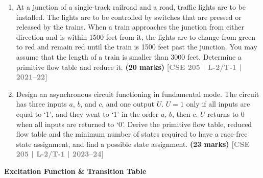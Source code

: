 \documentclass[12pt,a4paper]{article}
\newcommand{\yr}[1]{\hfill\textcolor{gray}{\small\textbf{[#1]}}}
\newcommand{\mk}[1]{\textcolor{orange!70!black}{\small\textbf{(#1 marks)}}}
\newcommand{\subtopic}[2]{%
  \vspace{10pt}
  \noindent\begin{tcolorbox}[colback=#1!8,colframe=#1,boxrule=0.6pt,arc=4pt,
    left=6pt,right=6pt,top=4pt,bottom=4pt]
    \small\bfseries\textcolor{#1}{#2}
  \end{tcolorbox}
  \vspace{2pt}
}
\begin{document}
\begin{enumerate}
\item At a junction of a single-track railroad and a road, traffic lights are to be installed. The lights are to be controlled by switches that are pressed or released by the trains. When a train approaches the junction from either direction and is within 1500 feet from it, the lights are to change from green to red and remain red until the train is 1500 feet past the junction. You may assume that the length of a train is smaller than 3000 feet. Determine a primitive flow table and reduce it.
\mk{20} \yr{CSE 205 | L-2/T-1 | 2021--22}

\item Design an asynchronous circuit functioning in fundamental mode. The circuit has three inputs $a$, $b$, and $c$, and one output $U$. $U=1$ only if all inputs are equal to `1', and they went to `1' in the order $a$, $b$, then $c$. $U$ returns to 0 when all inputs are returned to `0'. Derive the primitive flow table, reduced flow table and the minimum number of states required to have a race-free state assignment, and find a possible state assignment.
\mk{23} \yr{CSE 205 | L-2/T-1 | 2023--24}

\end{enumerate}


\subtopic{cF}{Excitation Function \& Transition Table}

\label{sub:s6-excitation}
\end{document}
